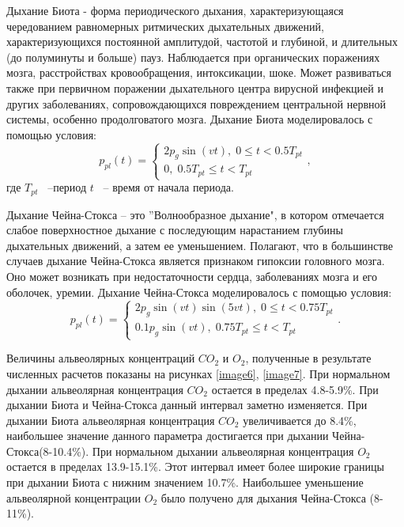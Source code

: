 Дыхание Биота - форма периодического дыхания, характеризующаяся чередованием равномерных ритмических дыхательных движений, характеризующихся постоянной амплитудой, частотой и глубиной,  и  длительных  (до полуминуты и больше) пауз. 
Наблюдается при органических поражениях мозга, расстройствах кровообращения, интоксикации, шоке. Может развиваться также при первичном поражении дыхательного центра вирусной инфекцией и других заболеваниях, сопровождающихся повреждением центральной нервной системы, особенно продолговатого мозга. Дыхание Биота моделировалось с помощью условия:
\begin{equation} \label{GrindEQ__41_} 
p_{pl} \left(t\right)=\left\{\begin{array}{c} {2p_{g} \sin \left(vt\right),\; 0\le t<0.5T_{pt} } \\ {0,\; 0.5T_{pt} \le t<T_{pt} } \end{array}\right. ,  
\end{equation} 
где $T_{pt} $ ~--период  $t$ ~-- время от начала периода.

Дыхание Чейна-Стокса – это ''Волнообразное дыхание", в котором отмечается слабое поверхностное дыхание с последующим нарастанием глубины дыхательных движений, а затем ее уменьшением.
Полагают, что в большинстве случаев дыхание Чейна-Стокса является признаком гипоксии головного мозга. Оно может возникать при недостаточности сердца, заболеваниях мозга и его оболочек, уремии. Дыхание Чейна-Стокса моделировалось с помощью условия:
\begin{equation} \label{GrindEQ__42_} 
p_{pl} \left(t\right)=\left\{\begin{array}{c} {2p_{g} \sin \left(vt\right)\sin \left(5vt\right),\; 0\le t<0.75T_{pt} } \\ {0.1p_{g} \sin \left(vt\right),\; 0.75T_{pt} \le t<T_{pt} } \end{array}\right. .  
\end{equation} 

Величины альвеолярных концентраций $CO_{2} $ и $O_{2} $, полученные в результате численных расчетов показаны на рисунках \ref{image6}, \ref{image7}. При нормальном дыхании альвеолярная концентрация $CO_{2} $ остается в пределах 4.8-5.9\%. При дыхании Биота и Чейна-Стокса данный интервал заметно изменяется.  При дыхании Биота альвеолярная концентрация $CO_{2} $ увеличивается до 8.4\%, наибольшее значение данного параметра достигается при дыхании Чейна-Стокса(8-10.4\%). При нормальном дыхании альвеолярная концентрация $O_{2} $ остается в пределах 13.9-15.1\%. Этот интервал имеет более широкие границы при дыхании Биота с нижним значением 10.7\%. Наибольшее уменьшение альвеолярной концентрации $O_{2} $ было получено для дыхания Чейна-Стокса (8-11\%).

